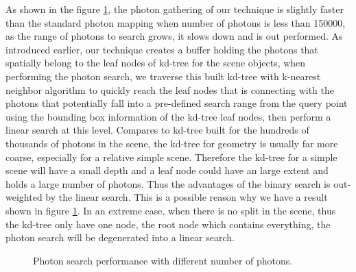 As shown in the figure \ref{fig:photon_search_1}, the photon gathering of our technique is slightly faster than the standard photon mapping when number of photons is less than 150000, as the range of photons to search grows, it slows down and is out performed. As introduced earlier, our technique creates a buffer holding the photons that spatially belong to the leaf nodes of kd-tree for the scene objects, when performing the photon search, we traverse this built kd-tree with k-nearest neighbor algorithm to quickly reach the leaf nodes that is connecting with the photons that potentially fall into a pre-defined search range from the query point using the bounding box information of the kd-tree leaf nodes, then perform a linear search at this level. Compares to kd-tree built for the hundreds of thousands of photons in the scene, the kd-tree for geometry is usually far more coarse, especially for a relative simple scene. Therefore the kd-tree for a simple scene will have a small depth and a leaf node could have an large extent and holds a large number of photons. Thus the advantages of the binary search is out-weighted by the linear search. This is a possible reason why we have a result shown in figure \ref{fig:photon_search_1}. In an extreme case, when there is no split in the scene, thus the kd-tree only have one node, the root node which contains everything, the photon search will be degenerated into a linear search.

\begin{figure}[ftp]
    \centering
    \renewcommand{\thefigure}{\thechapter.\arabic{figure}}
    \caption[Photon search performance with different number of photons]{Photon search performance with different number of photons. }
    \label{fig:photon_search_1}
\end{figure}


